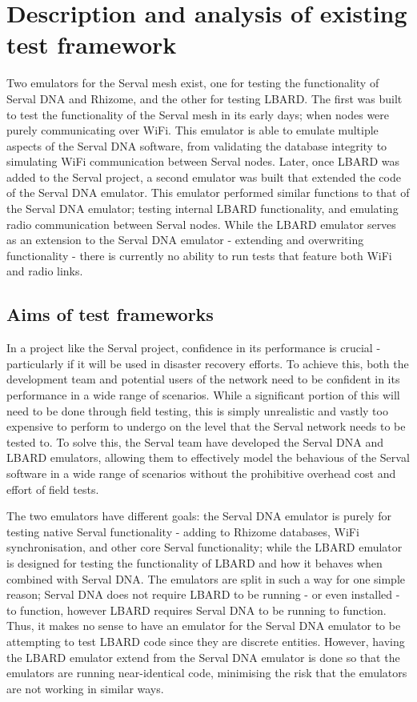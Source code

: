 \chapter{Description and analysis of existing test framework} 
\label{Chapter3} 

Two emulators for the Serval mesh exist, one for testing the functionality of Serval DNA and Rhizome, and the other for testing LBARD. 
The first was built to test the functionality of the Serval mesh in its early days; when nodes were purely communicating over WiFi. 
This emulator is able to emulate multiple aspects of the Serval DNA software, from validating the database integrity to simulating WiFi communication between Serval nodes. 
Later, once LBARD was added to the Serval project, a second emulator was built that extended the code of the Serval DNA emulator.
This emulator performed similar functions to that of the Serval DNA emulator; testing internal LBARD functionality, and emulating radio communication between Serval nodes. 
While the LBARD emulator serves as an extension to the Serval DNA emulator - extending and overwriting functionality - there is currently no ability to run tests that feature both WiFi and radio links. 


\section{Aims of test frameworks}
In a project like the Serval project, confidence in its performance is crucial - particularly if it will be used in disaster recovery efforts.
To achieve this, both the development team and potential users of the network need to be confident in its performance in a wide range of scenarios. 
While a significant portion of this will need to be done through field testing, this is simply unrealistic and vastly too expensive to perform to undergo on the level that the Serval network needs to be tested to.
To solve this, the Serval team have developed the Serval DNA and LBARD emulators, allowing them to effectively model the behavious of the Serval software in a wide range of scenarios without the prohibitive overhead cost and effort of field tests.

The two emulators have different goals: the Serval DNA emulator is purely for testing native Serval functionality - adding to Rhizome databases, WiFi synchronisation, and other core Serval functionality; while the LBARD emulator is designed for testing the functionality of LBARD and how it behaves when combined with Serval DNA.
The emulators are split in such a way for one simple reason; Serval DNA does not require LBARD to be running - or even installed - to function, however LBARD requires Serval DNA to be running to function.
Thus, it makes no sense to have an emulator for the Serval DNA emulator to be attempting to test LBARD code since they are discrete entities.
However, having the LBARD emulator extend from the Serval DNA emulator is done so that the emulators are running near-identical code, minimising the risk that the emulators are not working in similar ways.



